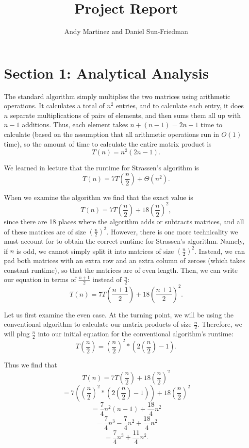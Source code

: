 \documentclass{article}
\title{Project Report}
\author{Andy Martinez and Daniel Sun-Friedman}
\begin{document}
\maketitle

\section{Section 1: Analytical Analysis}

The standard algorithm simply multiplies the two matrices using arithmetic operations. It calculates a total of $n^2$ entries, and to calculate each entry, it does $n$ separate multiplications of pairs of elements, and then sums them all up with $n-1$ additions. Thus, each element takes $n+(n-1)=2n-1$ time to calculate (based on the assumption that all arithmetic operations run in $O(1)$ time), so the amount of time to calculate the entire matrix product is $$T(n)=n^2(2n-1).$$

We learned in lecture that the runtime for Strassen's algorithm is $$T(n)=7T\left(\frac{n}{2}\right) + \Theta(n^2).$$

When we examine the algorithm we find that the exact value is $$T(n)=7T\left(\frac{n}{2}\right) + 18\left(\frac{n}{2}\right)^2,$$ since there are 18 places where the algorithm adds or subtracts matrices, and all of these matrices are of size $\left(\frac{n}{2}\right)^2$. However, there is one more technicality we must account for to obtain the correct runtime for Strassen's algorithm. Namely, if $n$ is odd, we cannot simply split it into matrices of size $\left(\frac{n}{2}\right)^2$. Instead, we can pad both matrices with an extra row and an extra column of zeroes (which takes constant runtime), so that the matrices are of even length. Then, we can write our equation in terms of $\frac{n+1}{2}$ instead of $\frac{n}{2}$: $$T(n)=7T\left(\frac{n+1}{2}\right) + 18\left(\frac{n+1}{2}\right)^2.$$

Let us first examine the even case. At the turning point, we will be using the conventional algorithm to calculate our matrix products of size $\frac{n}{2}$. Therefore, we will plug $\frac{n}{2}$ into our initial equation for the conventional algorithm's runtime: $$T\left(\frac{n}{2}\right) = \left(\frac{n}{2}\right)^2*\left(2\left(\frac{n}{2}\right)-1\right).$$

Thus we find that $$T(n)=7T\left(\frac{n}{2}\right) + 18\left(\frac{n}{2}\right)^2$$ $$= 7\left(\left(\frac{n}{2}\right)^2*\left(2\left(\frac{n}{2}\right)-1\right)\right) + 18\left(\frac{n}{2}\right)^2$$ $$= \frac{7}{4}n^2(n-1) + \frac{18}{4}n^2$$ $$= \frac{7}{4}n^3 - \frac{7}{4}n^2 + \frac{18}{4}n^2$$ $$= \frac{7}{4}n^3 + \frac{11}{4}n^2.$$
\end{document}
